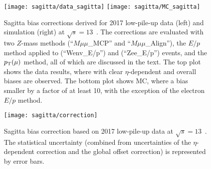 	
    \begin{figure}[p]
    	\begin{center}
    		\texttt{[image: sagitta/data\_sagitta]}
    		\texttt{[image: sagitta/MC\_sagitta]}
    		\caption{Sagitta bias corrections derived for 2017 low-pile-up data (left)
    			and simulation (right) at $\sqrt{s} = 13$~\TeV. The
    			corrections are evaluated with two $Z$-mass methods
    			(``$M\mu\mu$\_MCP'' and ``$M\mu\mu$\_Align''),
    			the $E/p$ method applied to \Wenu (``Wenv\_E/p'') and \Zee (``Zee\_E/p'')
    			events, and the $p_{\text{T}}(\mu)$ method, all of which are discussed in the text.
    			The top plot shows the data
    			results, where with clear $\eta$-dependent and overall biases
    			are observed. The bottom plot shows MC, where a bias smaller by a factor of at least 10,
    			with the exception of the electron $E/p$ method.}
    		\label{fig:allsagitta}
    	\end{center}
    \end{figure}
	

\begin{figure}[htb!]
	\begin{center}
		\texttt{[image: sagitta/correction]}
		\caption{Sagitta bias correction based on 2017 low-pile-up
			data at $\sqrt{s} = 13$~\TeV. The statistical
			uncertainty (combined from uncertainties of the
			$\eta$-dependent correction and the global offset
			correction) is represented by error bars.}
		\label{fig:sagittacorrection}
	\end{center}
\end{figure}
\clearpage

